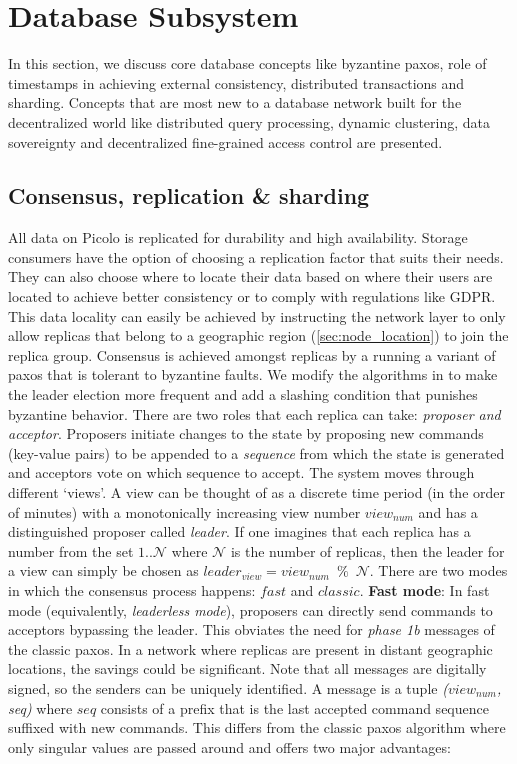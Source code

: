 \section{Database Subsystem}
In this section, we discuss core database concepts like byzantine paxos, role of timestamps in achieving external consistency, distributed transactions and sharding. Concepts that are most new to a database network built for the  decentralized world like distributed query processing, dynamic clustering, data sovereignty and decentralized fine-grained access control are presented.

\subsection{Consensus, replication \& sharding} \label{sec:paxos}
All data on Picolo is replicated for durability and high availability. Storage consumers have the option of choosing a replication factor that suits their needs. They can also choose where to locate their data based on where their users are located to achieve better consistency or to comply with regulations like GDPR. This data locality can easily be achieved by instructing the network layer to only allow replicas that belong to a geographic region (\cref{sec:node_location}) to join the replica group. Consensus is achieved amongst replicas by a running a variant of paxos that is tolerant to byzantine faults. We modify the algorithms in \cite{byzantine_paxos} to make the leader election more frequent and add a slashing condition that punishes byzantine behavior. There are two roles that each replica can take: \textit{proposer and acceptor}. Proposers initiate changes to the state by proposing new commands (key-value pairs) to be appended to a \textit{sequence} from which the state is generated and acceptors vote on which sequence to accept. The system moves through different `views'. A view can be thought of as a discrete time period (in the order of minutes) with a monotonically increasing view number $view_{num}$ and has a distinguished proposer called \textit{leader}. If one imagines that each replica has a number from the set ${1..\mathcal{N}}$ where $\mathcal{N}$ is the number of replicas, then the leader for a view can simply be chosen as $leader_{view} = view_{num} \enspace \% \enspace \mathcal{N}$. There are two modes in which the consensus process happens: $fast$ and $classic$.
\newline\newline
\textbf{Fast mode}: In fast mode (equivalently, \textit{leaderless mode}), proposers can directly send commands to acceptors bypassing the leader. This obviates the need for \textit{phase 1b} messages of the classic paxos. In a network where replicas are present in distant geographic locations, the savings could be significant. Note that all messages are digitally signed, so the senders can be uniquely identified. A message is a tuple \textit{($view_{num}$, seq)} where $seq$ consists of a prefix that is the last accepted command sequence suffixed with new commands. This differs from the classic paxos algorithm where only singular values are passed around and offers two major advantages:

